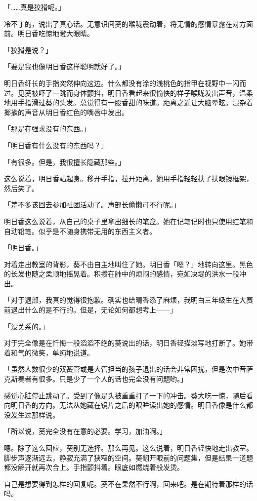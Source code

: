 \documentclass[UTF8]{ctexart}
\begin{document}
    「……真是狡猾呢。」

    冷不丁的，说出了真心话。无意识间葵的喉咙震动着，将无情的感情暴露在对方面前。明日香吃惊地瞪大眼睛。

    「狡猾是说？」

    「要是我也像明日香这样聪明就好了。」

    明日香纤长的手指突然伸向这边。什么都没有涂的浅桃色的指甲在视野中一闪而过。见葵被吓了一跳而身体颤抖，明日香看起来很愉快的样子喉咙发出声音，温柔地用手指滑过葵的头发。总觉得有一股香甜的味道。距离之近让大脑晕眩。混杂着揶揄的声音从明日香红色的嘴唇中发出。

    「那是在强求没有的东西。」

    「明日香有什么没有的东西吗？」

    「有很多。但是，我很擅长隐藏那些。」

    这么说着，明日香站起身。移开手指，拉开距离。她用手指轻轻扶了扶眼镜框架，然后笑了。

    「差不多该回去参加社团活动了。声部长偷懒可不行呢。」

    明日香这么说着，从自己的桌子里拿出细长的笔盒。她在记笔记时也只使用红笔和自动铅笔。似乎是不随身携带无用的东西主义者。

    「明日香。」

    对着走出教室的背影，葵不由自主地叫住了她。明日香「嗯？」地转向这里。黑色的长发也随之柔顺地摇晃着。积攒在肺中的烦闷的感情，宛如决堤的洪水一般冲出。

    「对于退部，我真的觉得很抱歉。确实也给晴香添了麻烦，我明白三年级生在大赛前退出什么的是不行的。但是，无论如何都想考上——」

    「没关系的。」

    对于完全像是在忏悔一般滔滔不绝的葵说出的话，明日香轻描淡写地打断了。她带着和气的微笑，单纯地说道。

    「虽然人数很少的双簧管或是大管担当的孩子退出的话会非常困扰，但是次中音萨克斯奏者有很多。只是少了一个人的话也完全没有问题哟。」

    感觉心脏停止跳动了。受到了像是头被重重打了一下的冲击。葵大吃一惊，随后看向明日香的方向。无法从她藏在镜片之后的眼眸读出她的感情。明日香像是什么都没发生过那样说。

    「所以说，葵完全没有在意的必要。学习，加油啊。」

    嗯。除了这么回应，葵别无选择。那么再见。这么说着，明日香轻快地走出教室。脚步声逐渐远去，静寂充满了狭窄的空间。葵翻开眼前的问题集，但是结果一道题都没解开就再次合上。手指颤抖着。眼底如燃烧着般发烫。

    自己是想要得到怎样的回复呢。葵不在果然不行啊，回来吧。是在期待着那样的话吗。
\end{document}
